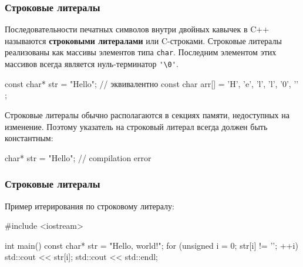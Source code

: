 \documentclass[compress, 8pt]{beamer}
\begin{document}
\begin{frame}[fragile]

    \frametitle{Строковые литералы}

    Последовательности печатных символов внутри двойных кавычек в C++
    называются \textbf{строковыми литералами}\footnotemark{} или C-строками.
    Строковые литералы реализованы как массивы элементов типа \verb|char|.
    Последним элементом этих массивов всегда является нуль-терминатор \verb|'\0'|.


    \begin{myinplacelisting}[minted language=cpp]
const char* str = "Hello";
// эквивалентно
const char arr[] = { 'H', 'e', 'l', 'l', '0', '\0' };
    \end{myinplacelisting}

    Строковые литералы обычно располагаются в секциях памяти, недоступных
    на изменение.
    Поэтому указатель на строковый литерал всегда должен быть константным:

    \begin{myinplacelisting}[minted language=cpp]
char* str = "Hello"; // compilation error
    \end{myinplacelisting}

\end{frame}

\begin{frame}[fragile]

    \frametitle{Строковые литералы}

    Пример итерирования по строковому литералу:

    \begin{myinplacelisting}[minted language=cpp]
#include <iostream>

int main() {
    const char* str = "Hello, world!";
    for (unsigned i = 0; str[i] != '\0'; ++i) {
        std::cout << str[i];
    }
    std::cout << std::endl;
}
    \end{myinplacelisting}

\end{frame}
\end{document}
